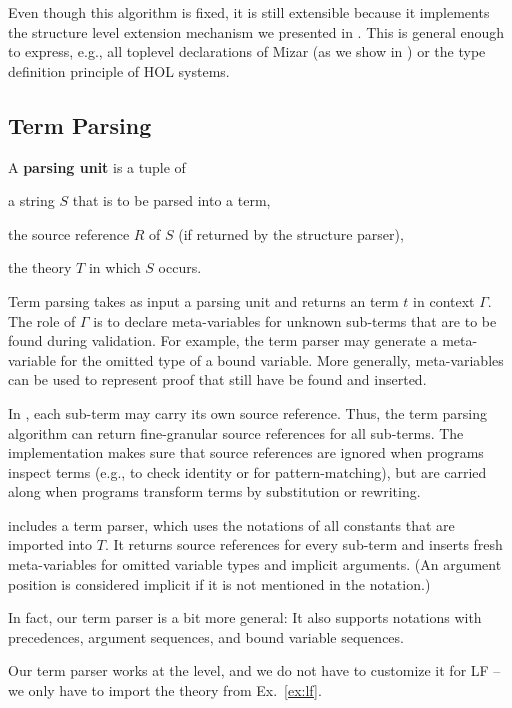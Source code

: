 Even though this algorithm is fixed, it is still extensible because it implements the structure level extension mechanism we presented in \cite{HKR:extending:12}.
This is general enough to express, e.g., all toplevel declarations of Mizar (as we show in \cite{IKRU:mizar:11}) or the type definition principle of HOL systems.

\subsection{Term Parsing}\label{sec:tp}

A \textbf{parsing unit} is a tuple of
\begin{inparaenum}
	\item a string $S$ that is to be parsed into a term,
	\item the source reference $R$ of $S$ (if returned by the structure parser),
	\item the theory $T$ in which $S$ occurs.
\end{inparaenum}
Term parsing takes as input a parsing unit and returns an \mmt term $t$ in context $\Gamma$.
The role of $\Gamma$ is to declare meta-variables for unknown sub-terms that are to be found during validation.
For example, the term parser may generate a meta-variable for the omitted type of a bound variable.
More generally, meta-variables can be used to represent proof that still have be found and inserted.

In \mmt, each sub-term may carry its own source reference.
Thus, the term parsing algorithm can return fine-granular source references for all sub-terms.
The \mmt implementation makes sure that source references are ignored when programs inspect terms (e.g., to check identity or for pattern-matching), but are carried along when programs transform terms by substitution or rewriting.

\begin{example}
\jmmt includes a term parser, which uses the \mmt notations of all constants that are imported into $T$.
It returns source references for every sub-term and inserts fresh meta-variables for omitted variable types and implicit arguments.
(An argument position is considered implicit if it is not mentioned in the notation.)

In fact, our term parser is a bit more general: It also supports notations with precedences, argument sequences, and bound variable sequences.

Our term parser works at the \mmt level, and we do not have to customize it for LF -- we only have to import the theory from Ex.~\ref{ex:lf}.
\end{example}





